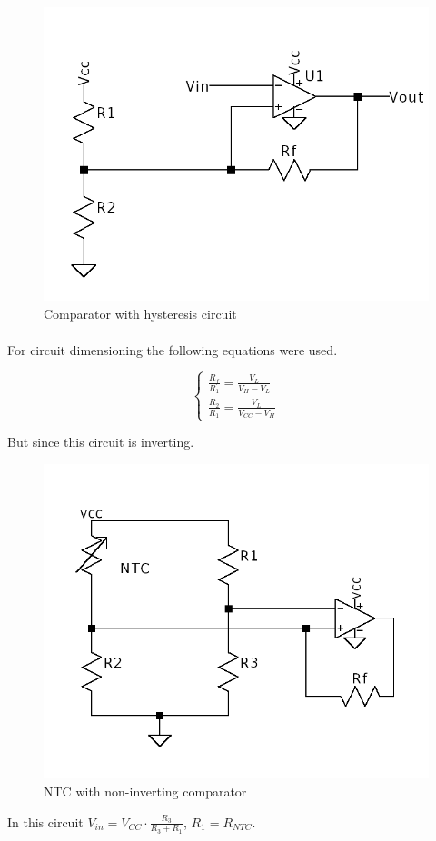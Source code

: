 \begin{figure}[H]
    \centering
    \includegraphics*[scale = 0.5]{Images/SingleSupplySchimidtTrigger.png}
    \caption{Comparator with hysteresis circuit \textsubscript{\cite{NTC_datasheet}}}
    \label{fig:ComparatorCirc}
\end{figure}

For circuit dimensioning the following equations were used\textsuperscript{\cite{TI-Comparator-Hysteresis}}.

\begin{equation}
    \begin{cases}
        \frac{R_f}{R_1} = \frac{V_L}{V_H - V_L}\\
        \frac{R_2}{R_1} = \frac{V_L}{V_{CC}-V_{H}}
    \end{cases}
\end{equation}

But since this circuit is inverting.

\begin{figure}[H]
    \centering
    \includegraphics*[scale = 0.5]{Images/NTCCirc.png}
    \caption{NTC with non-inverting comparator}
    \label{fig:NTCCirc}
\end{figure}

In this circuit $V_{in} = V_{CC}\cdot\frac{R_3}{R_3+R_1}$, $R_1 = R_{NTC}$.